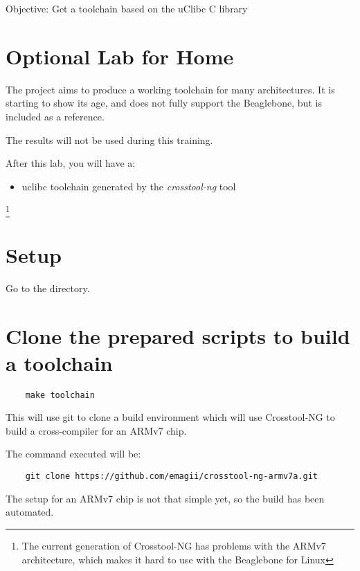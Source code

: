 {Objective: Get a toolchain based on the uClibc C library}

\section{Optional Lab for Home}

The  project aims to produce a working toolchain
for many architectures. It is starting to show its age, and does
not fully support the Beaglebone, but is included as a reference.

The results will not be used during this training.

After this lab, you will have a:

\begin{itemize}
\item uclibc toolchain generated by the {\em crosstool-ng} tool
\end{itemize}

\footnote{The current generation of Crosstool-NG has problems with the ARMv7 architecture, 
which makes it hard to use with the Beaglebone for Linux}

\clearpage

\section{Setup}

Go to the \labdir directory.

\section{Clone the prepared scripts to build a toolchain}

\begin{verbatim}
	make toolchain
\end{verbatim}

This will use git to clone a build environment which will use 
Crosstool-NG to build a cross-compiler for an ARMv7 chip.

The command executed will be:

\begin{verbatim}
	git clone https://github.com/emagii/crosstool-ng-armv7a.git
\end{verbatim}


The setup for an ARMv7 chip is not that simple yet,
so the build has been automated. 


